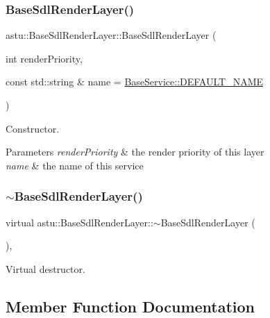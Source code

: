 \subsubsection{\texorpdfstring{Base\+Sdl\+Render\+Layer()}{BaseSdlRenderLayer()}}
{\footnotesize\ttfamily astu\+::\+Base\+Sdl\+Render\+Layer\+::\+Base\+Sdl\+Render\+Layer (\begin{DoxyParamCaption}\item[{int}]{render\+Priority,  }\item[{const std\+::string \&}]{name = {\ttfamily \hyperlink{classastu_1_1BaseService_a9483b26ad631bd14646ef2d2170cd828}{Base\+Service\+::\+D\+E\+F\+A\+U\+L\+T\+\_\+\+N\+A\+ME}} }\end{DoxyParamCaption})}

Constructor.


\begin{DoxyParams}{Parameters}
{\em render\+Priority} & the render priority of this layer \\
\hline
{\em name} & the name of this service \\
\hline
\end{DoxyParams}
\mbox{\label{classastu_1_1BaseSdlRenderLayer_a062e0d1188290dea9e8329265c114764}} 
\subsubsection{\texorpdfstring{$\sim$\+Base\+Sdl\+Render\+Layer()}{~BaseSdlRenderLayer()}}
{\footnotesize\ttfamily virtual astu\+::\+Base\+Sdl\+Render\+Layer\+::$\sim$\+Base\+Sdl\+Render\+Layer (\begin{DoxyParamCaption}{ }\end{DoxyParamCaption})\hspace{0.3cm}{\ttfamily [inline]}, {\ttfamily [virtual]}}

Virtual destructor. 

\subsection{Member Function Documentation}
\mbox{\label{classastu_1_1BaseSdlRenderLayer_a612a7ecc518ea150bbed605a6aa19602}} 
